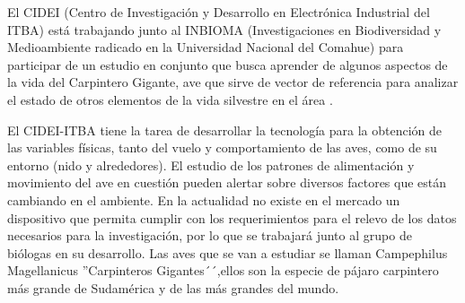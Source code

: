 El CIDEI (Centro de Investigación y Desarrollo en Electrónica Industrial del ITBA) está trabajando junto al INBIOMA (Investigaciones en Biodiversidad y Medioambiente radicado en la Universidad Nacional del Comahue) para participar de un estudio en conjunto que busca aprender de algunos aspectos de la vida del Carpintero Gigante, ave que sirve de vector de referencia para analizar el estado de otros elementos de la vida silvestre en el área \cite{ref:PaperValeriaOjeda}.

El CIDEI-ITBA tiene la tarea de desarrollar la tecnología para la obtención de las variables físicas, tanto del vuelo y comportamiento de las aves, como de su entorno (nido y alrededores). El estudio de los patrones de alimentación y movimiento del ave en cuestión pueden alertar sobre diversos factores que están cambiando en el ambiente. En la actualidad no existe en el mercado un dispositivo que permita cumplir con los requerimientos para el relevo de los datos necesarios para la investigación, por lo que se trabajará junto al grupo de biólogas en su desarrollo.
Las aves que se van a estudiar se llaman Campephilus Magellanicus ''Carpinteros Gigantes´´,ellos son la especie de pájaro carpintero más grande de Sudamérica y de las más grandes del mundo.

